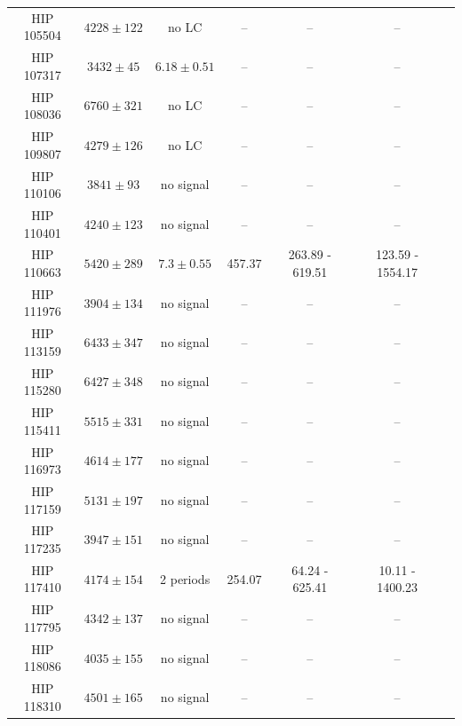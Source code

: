 \begin{longtable}{|c|c|c|c|c|c|c|}
HIP 105504 & $ 4228 \pm 122 $ & no LC &-- &-- &-- \\
HIP 107317 & $ 3432 \pm 45 $ & $ 6.18 \pm 0.51 $ &-- &-- &-- \\
HIP 108036 & $ 6760 \pm 321 $ & no LC &-- &-- &-- \\
HIP 109807 & $ 4279 \pm 126 $ & no LC &-- &-- &-- \\
HIP 110106 & $ 3841 \pm 93 $ & no signal &-- &-- &-- \\
HIP 110401 & $ 4240 \pm 123 $ & no signal &-- &-- &-- \\
HIP 110663 & $ 5420 \pm 289 $ &$ 7.3 \pm 0.55 $ & 457.37 & 263.89 - 619.51 & 123.59 - 1554.17 \\
HIP 111976 & $ 3904 \pm 134 $ & no signal &-- &-- &-- \\
HIP 113159 & $ 6433 \pm 347 $ & no signal &-- &-- &-- \\
HIP 115280 & $ 6427 \pm 348 $ & no signal &-- &-- &-- \\
HIP 115411 & $ 5515 \pm 331 $ & no signal &-- &-- &-- \\
HIP 116973 & $ 4614 \pm 177 $ & no signal &-- &-- &-- \\
HIP 117159 & $ 5131 \pm 197 $ & no signal &-- &-- &-- \\
HIP 117235 & $ 3947 \pm 151 $ & no signal &-- &-- &-- \\
HIP 117410 & $ 4174 \pm 154 $ &2 periods & 254.07 & 64.24 - 625.41 & 10.11 - 1400.23 \\
HIP 117795 & $ 4342 \pm 137 $ & no signal &-- &-- &-- \\
HIP 118086 & $ 4035 \pm 155 $ & no signal &-- &-- &-- \\
HIP 118310 & $ 4501 \pm 165 $ & no signal &-- &-- &--
\label{tab:gyro}
\end{longtable}

